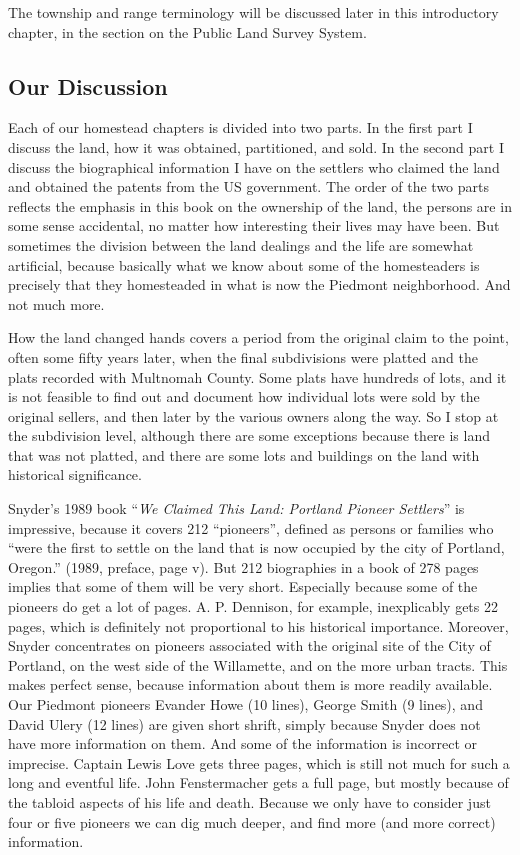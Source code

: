 \documentclass[
  12pt,
]{book}
\begin{document}
The township and range terminology will be discussed later in this introductory chapter, in the section on the Public Land Survey System.

\hypertarget{our-discussion}{%
\subsection{Our Discussion}\label{our-discussion}}

Each of our homestead chapters is divided into two parts. In the first part I discuss the land, how it was obtained, partitioned, and sold. In the second part I discuss the biographical information I have on the settlers who claimed the land and obtained the patents from the US government. The order of the two parts reflects the emphasis in this book on the ownership of the land, the persons are in some sense accidental, no matter how interesting their lives may have been. But sometimes the division between the land dealings and the life are somewhat artificial, because basically what we know about some of the homesteaders is precisely that they homesteaded in what is now the Piedmont neighborhood. And not much more.

How the land changed hands covers a period from the original claim to the point, often some fifty years later, when the final subdivisions were platted and the plats recorded with Multnomah County. Some plats have hundreds of lots, and it is not feasible to find out and document how individual lots were sold by the original sellers, and then later by the various owners along the way. So I stop at the subdivision level, although there are some exceptions because there is land that was not platted, and there are some lots and buildings on the land with historical significance.

Snyder's 1989 book ``\emph{We Claimed This Land: Portland Pioneer Settlers}'' is impressive, because it covers 212 ``pioneers'', defined as persons or families who ``were the first to settle on the land that is now occupied by the city of Portland, Oregon.'' (1989, preface, page v). But 212 biographies in a book of 278 pages implies that some of them will be very short. Especially because some of the pioneers do get a lot of pages. A. P. Dennison, for example, inexplicably gets 22 pages, which is definitely not proportional to his historical importance. Moreover, Snyder concentrates on pioneers associated with the original site of the City of Portland, on the west side of the Willamette, and on the more urban tracts. This makes perfect sense, because information about them is more readily available. Our Piedmont pioneers Evander Howe (10 lines), George Smith (9 lines), and David Ulery (12 lines) are given short shrift, simply because Snyder does not have more information on them. And some of the information is incorrect or imprecise. Captain Lewis Love gets three pages, which is still not much for such a long and eventful life. John Fenstermacher gets a full page, but mostly because of the tabloid aspects of his life and death. Because we only have to consider just four or five pioneers we can dig much deeper, and find more (and more correct) information.
\end{document}
